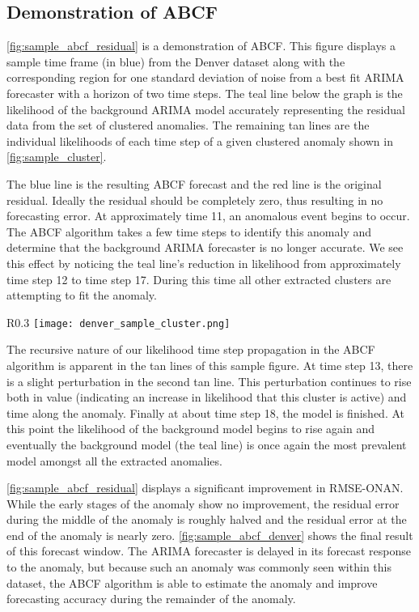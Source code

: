 \subsection{Demonstration of ABCF}
\ref{fig:sample_abcf_residual} is a demonstration of ABCF.  This figure displays a sample time frame (in blue) from the Denver dataset along with the corresponding region for one standard deviation of noise from a best fit ARIMA forecaster with a horizon of two time steps.  The teal line below the graph is the likelihood of the background ARIMA model accurately representing the residual data from the set of clustered anomalies.  The remaining tan lines are the individual likelihoods of each time step of a given clustered anomaly shown in \ref{fig:sample_cluster}.  

The blue line is the resulting ABCF forecast and the red line is the original residual.  Ideally the residual should be completely zero, thus resulting in no forecasting error.  At approximately time 11, an anomalous event begins to occur.  The ABCF algorithm takes a few time steps to identify this anomaly and determine that the background ARIMA forecaster is no longer accurate.  We see this effect by noticing the teal line's reduction in likelihood from approximately time step 12 to time step 17.  During this time all other extracted clusters are attempting to fit the anomaly.

\begin{wrapfigure}{R}{0.3\textwidth}
\centering
\texttt{[image: denver\_sample\_cluster.png]}
\caption{Extracted sample clustered anomaly.}
\label{fig:sample_cluster}
\end{wrapfigure}

The recursive nature of our likelihood time step propagation in the ABCF algorithm is apparent in the tan lines of this sample figure.  At time step 13, there is a slight perturbation in the second tan line.  This perturbation continues to rise both in value (indicating an increase in likelihood that this cluster is active) and time along the anomaly.  Finally at about time step 18, the model is finished.  At this point the likelihood of the background model begins to rise again and eventually the background model (the teal line) is once again the most prevalent model amongst all the extracted anomalies.

\ref{fig:sample_abcf_residual} displays a significant improvement in RMSE-ONAN.  While the early stages of the anomaly show no improvement, the residual error during the middle of the anomaly is roughly halved and the residual error at the end of the anomaly is nearly zero.  \ref{fig:sample_abcf_denver} shows the final result of this forecast window.  The ARIMA forecaster is delayed in its forecast response to the anomaly, but because such an anomaly was commonly seen within this dataset, the ABCF algorithm is able to estimate the anomaly and improve forecasting accuracy during the remainder of the anomaly.

